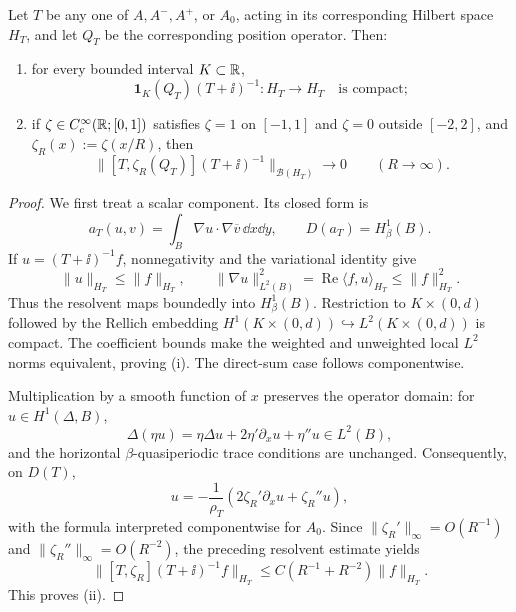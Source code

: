\begin{lemma}
\label{lem:appendix-local-compactness}
Let $T$ be any one of $A,A^-,A^+$, or $A_0$, acting in its corresponding
Hilbert space $H_T$, and let $Q_T$ be the corresponding position operator.
Then:
\begin{enumerate}[label=\textup{(\roman*)},leftmargin=*]
  \item for every bounded interval $K\subset\mathbb{R}$,
  \[
    \mathbf 1_K(Q_T)(T+\ii)^{-1}:H_T\longrightarrow H_T
    \quad\text{is compact};
  \]
  \item if $\zeta\in C_c^\infty(\mathbb{R};[0,1])$ satisfies
  $\zeta=1$ on $[-1,1]$ and $\zeta=0$ outside $[-2,2]$, and
  $\zeta_R(x):=\zeta(x/R)$, then
  \begin{equation}
    \bigl\|[T,\zeta_R(Q_T)](T+\ii)^{-1}\bigr\|_{\mathcal B(H_T)}
    \longrightarrow0
    \qquad(R\to\infty).
    \label{eq:appendix-commutator-limit}
  \end{equation}
\end{enumerate}
\end{lemma}
\begin{proof}
We first treat a scalar component.  Its closed form is
\[
  a_T(u,v)=\int_B\nabla u\cdot\nabla\overline v\,\dd x\dd y,
  \qquad D(a_T)=H^1_\beta(B).
\]
If $u=(T+\ii)^{-1}f$, nonnegativity and the variational identity give
\[
  \|u\|_{H_T}\leq\|f\|_{H_T},
  \qquad
  \|\nabla u\|_{L^2(B)}^2
  =\operatorname{Re}\langle f,u\rangle_{H_T}
  \leq\|f\|_{H_T}^2.
\]
Thus the resolvent maps boundedly into $H^1_\beta(B)$.  Restriction to
$K\times(0,d)$ followed by the Rellich embedding
$H^1(K\times(0,d))\hookrightarrow L^2(K\times(0,d))$ is compact.  The
coefficient bounds make the weighted and unweighted local $L^2$ norms
equivalent, proving (i).  The direct-sum case follows componentwise.

Multiplication by a smooth function of $x$ preserves the operator domain:
for $u\in H^1(\Delta,B)$,
\[
  \Delta(\eta u)=\eta\Delta u+2\eta'\partial_xu+\eta''u\in L^2(B),
\]
and the horizontal $\beta$-quasiperiodic trace conditions are unchanged.
Consequently, on $D(T)$,
\begin{equation}
  [T,\zeta_R]u
  =-\frac1{\rho_T}
    \left(2\zeta_R'\partial_xu+\zeta_R''u\right),
  \label{eq:appendix-commutator-formula}
\end{equation}
with the formula interpreted componentwise for $A_0$.  Since
$\|\zeta_R'\|_\infty=O(R^{-1})$ and
$\|\zeta_R''\|_\infty=O(R^{-2})$, the preceding resolvent estimate yields
\[
  \bigl\|[T,\zeta_R](T+\ii)^{-1}f\bigr\|_{H_T}
  \leq C\left(R^{-1}+R^{-2}\right)\|f\|_{H_T}.
\]
This proves (ii).
\end{proof}

